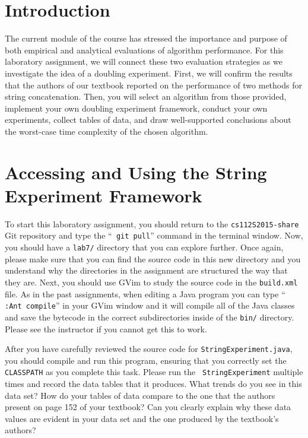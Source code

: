 


\usepackage[compact]{titlesec}


\section*{Introduction}

The current module of the course has stressed the importance and purpose of both empirical and analytical evaluations of
algorithm performance. For this laboratory assignment, we will connect these two evaluation strategies as we investigate
the idea of a doubling experiment. First, we will confirm the results that the authors of our textbook reported on the
performance of two methods for string concatenation. Then, you will select an algorithm from those provided, implement
your own doubling experiment framework, conduct your own experiments, collect tables of data, and draw well-supported
conclusions about the worst-case time complexity of the chosen algorithm.

\section*{Accessing and Using the String Experiment Framework}

To start this laboratory assignment, you should return to the {\tt cs112S2015-share} Git repository and type the ``{\tt
git pull}'' command in the terminal window.  Now, you should have a {\tt lab7/} directory that you can explore further.
Once again, please make sure that you can find the source code in this new directory and you understand why the
directories in the assignment are structured the way that they are. Next, you should use GVim to study the source code
in the {\tt build.xml} file.  As in the past assignments, when editing a Java program you can type ``{\tt
:Ant compile}'' in your GVim window and it will compile all of the Java classes and save the bytecode in the correct
subdirectories inside of the {\tt bin/} directory.  Please see the instructor if you cannot get this to work.

After you have carefully reviewed the source code for {\tt StringExperiment.java}, you should compile and run this
program, ensuring that you correctly set the {\tt CLASSPATH} as you complete this task. Please run the {\tt
StringExperiment} multiple times and record the data tables that it produces. What trends do you see in this data set?
How do your tables of data compare to the one that the authors present on page 152 of your textbook? Can you clearly
explain why these data values are evident in your data set and the one produced by the textbook's authors?

